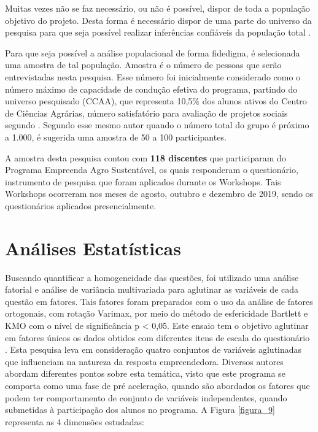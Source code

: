 Muitas  vezes  não  se  faz necessário,  ou não é possível, dispor de toda a população objetivo do projeto. Desta forma é necessário dispor de uma parte do universo da pesquisa para que seja possível realizar inferências confiáveis da população total \cite{marino_manual_2003}.

Para que seja possível a análise populacional de forma fidedigna, é selecionada uma amostra de tal população. Amostra é o número de pessoas que serão entrevistadas nesta pesquisa. Esse número foi inicialmente considerado como o número máximo de capacidade de condução efetiva do programa, partindo do universo pesquisado (CCAA), que  representa 10,5\% dos alunos ativos do Centro de Ciências Agrárias, número satisfatório para avaliação de projetos sociais segundo . Segundo esse mesmo autor quando o número total do grupo é próximo a 1.000, é sugerida uma amostra de 50 a 100 participantes.

A amostra desta pesquisa contou com \textbf{118 discentes} que participaram do Programa Empreenda Agro Sustentável, os quais responderam o questionário, instrumento de pesquisa que foram aplicados durante os Workshops. Tais Workshops ocorreram nos meses de agosto, outubro e dezembro de 2019, sendo os questionários aplicados presencialmente.

\section{Análises Estatísticas}


Buscando quantificar a homogeneidade das questões, foi utilizado uma análise fatorial e análise de variância multivariada para aglutinar as variáveis de cada questão em fatores. Tais fatores foram preparados com o uso da análise de fatores ortogonais, com rotação Varimax, por meio do método de esfericidade Bartlett e KMO com o nível de significância p < 0,05. Este ensaio tem o objetivo aglutinar em fatores únicos os dados obtidos com diferentes itens de escala do questionário \cite{hair_multivariate_2006}. Esta pesquisa leva em consideração quatro conjuntos de variáveis aglutinadas que influenciam na natureza da resposta empreendedora. Diversos autores abordam diferentes pontos sobre esta temática, visto que este programa se comporta como uma fase de pré aceleração, quando são abordados os fatores que podem ter comportamento de conjunto de variáveis independentes, quando submetidas à participação dos alunos no programa. A Figura \ref{figura_9} representa as 4 dimensões estudadas:


